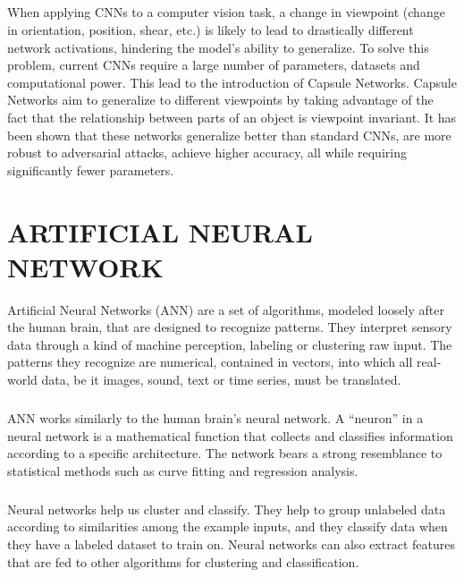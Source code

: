\documentclass[a4paper,12pt]{report}
\begin{document}
\paragraph{}
When applying CNNs to a computer vision task, a change in viewpoint (change in orientation, position, shear, etc.) is likely to lead to drastically different network activations, hindering the model’s ability to generalize. To solve this problem, current CNNs require a large number of parameters, datasets and computational power. This lead to the introduction of Capsule Networks. Capsule Networks aim to generalize to different viewpoints by taking advantage of the fact that the relationship between parts of an object is viewpoint invariant. It has been shown that these networks generalize better than standard CNNs, are more robust to adversarial attacks, achieve higher accuracy, all while requiring significantly fewer parameters.

\renewcommand\chaptername{CHAPTER}
\chapter{ARTIFICIAL NEURAL NETWORK}
Artificial Neural Networks (ANN)  are a set of algorithms, modeled loosely after the human brain, that are designed to recognize patterns. They interpret sensory data through a kind of machine perception, labeling or clustering raw input. The patterns they recognize are numerical, contained in vectors, into which all real-world data, be it images, sound, text or time series, must be translated.

\paragraph{}ANN works similarly to the human brain’s neural network. A “neuron” in a neural network is a mathematical function that collects and classifies information according to a specific architecture. The network bears a strong resemblance to statistical methods such as curve fitting and regression analysis.

\paragraph{}
Neural networks help us cluster and classify. They help to group unlabeled data according to similarities among the example inputs, and they classify data when they have a labeled dataset to train on. Neural networks can also extract features that are fed to other algorithms for clustering and classification.
\end{document}
